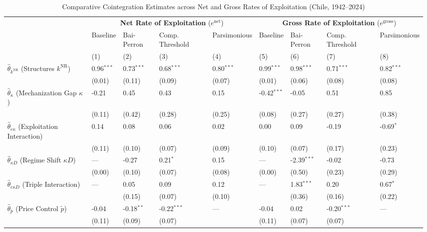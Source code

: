 \begin{table}[h!]
	\centering
	\caption{Comparative Cointegration Estimates across Net and Gross Rates of Exploitation (Chile, 1942--2024)}
	\label{tab:chile_e_comparison}
	\small
	\begin{tabular}{p{3.5cm}p{1.35cm}p{1.35cm}p{1.35cm}p{1.35cm}p{1.35cm}p{1.35cm}p{1.35cm}p{1.35cm}}
		\toprule
		& \multicolumn{4}{c}{\textbf{Net Rate of Exploitation} ($e^{\text{net}}$)} & \multicolumn{4}{c}{\textbf{Gross Rate of Exploitation} ($e^{\text{gross}}$)} \\
		\cmidrule(lr){2-5} \cmidrule(lr){6-9}
		& Baseline & Bai-Perron & Comp. Threshold & Parsimonious & Baseline & Bai-Perron & Comp. Threshold & Parsimonious \\
		& (1) & (2) & (3) & (4) & (5) & (6) & (7) & (8) \\
		\midrule
		$\hat{\theta}_{k^{\text{NR}}}$ (Structures $k^{\text{NR}}$) & 0.96$^{***}$ & 0.73$^{***}$ & 0.68$^{***}$ & 0.80$^{***}$ & 0.99$^{***}$ & 0.98$^{***}$ & 0.71$^{***}$ & 0.82$^{***}$ \\
		& (0.01) & (0.11) & (0.09) & (0.07) & (0.01) & (0.06) & (0.08) & (0.08) \\
		$\hat{\theta}_{\kappa}$ (Mechanization Gap $\kappa$) & -0.21 & 0.45 & 0.43 & 0.15 & -0.42$^{***}$ & -0.05 & 0.51 & 0.85 \\
		& (0.11) & (0.42) & (0.28) & (0.25) & (0.08) & (0.27) & (0.27) & (0.38) \\
		$\hat{\theta}_{e\kappa}$ (Exploitation Interaction) & 0.14 & 0.08 & 0.06 & 0.02 & 0.00 & 0.09 & -0.19 & -0.69$^{*}$ \\
		& (0.11) & (0.10) & (0.07) & (0.09) & (0.10) & (0.07) & (0.17) & (0.23) \\
		$\hat{\theta}_{\kappa D}$ (Regime Shift $\kappa D$) & — & -0.27 & 0.21$^{*}$ & 0.15 & — & -2.39$^{***}$ & -0.02 & -0.73 \\
		& (0.00) & (0.10) & (0.07) & (0.08) & (0.00) & (0.50) & (0.23) & (0.29) \\
		$\hat{\theta}_{e\kappa D}$ (Triple Interaction) & — & 0.05 & 0.09 & 0.12 & — & 1.83$^{***}$ & 0.20 & 0.67$^{*}$ \\
		&  & (0.15) & (0.07) & (0.10) &  & (0.36) & (0.16) & (0.22) \\
		$\hat{\theta}_{p}$ (Price Control $\tilde{p}$) & -0.04 & -0.18$^{**}$ & -0.22$^{***}$ & — & -0.04 & 0.02 & -0.20$^{***}$ & — \\
		& (0.11) & (0.09) & (0.07) &  & (0.11) & (0.07) & (0.07) &  \\
		\midrule

\end{tabular}
\end{table}
